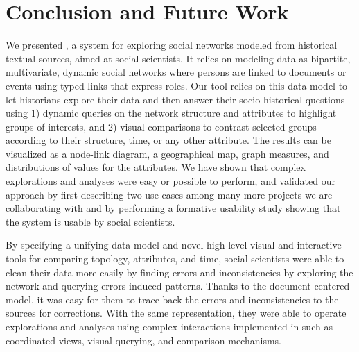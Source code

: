 \section{Conclusion and Future Work}

We presented \name, a system for exploring social networks modeled from historical textual sources, aimed at social scientists.
It relies on modeling data as bipartite, multivariate, dynamic social networks where persons are linked to documents or events using typed links that express roles.
Our tool \name relies on this data model to let historians explore their data and then answer their socio-historical questions using 1) dynamic queries on the network structure and attributes to highlight groups of interests, and 2) visual comparisons to contrast selected groups according to their structure, time, or any other attribute.
The results can be visualized as a node-link diagram, a geographical map, graph measures, and distributions of values for the attributes.
We have shown that complex explorations and analyses were easy or possible to perform, and validated our approach by first describing two use cases among many more projects we are collaborating with and by performing a formative usability study showing that the system is usable by social scientists.

By specifying a unifying data model and novel high-level visual and interactive tools for comparing topology, attributes, and time, social scientists were able to clean their data more easily by finding errors and inconsistencies by exploring the network and querying errors-induced patterns.
Thanks to the document-centered model, it was easy for them to trace back the errors and inconsistencies to the sources for corrections.
With the same representation, they were able to operate explorations and analyses using complex interactions implemented in \name such as coordinated views, visual querying, and comparison mechanisms.

